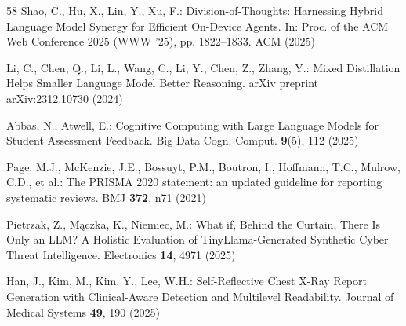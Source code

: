 \begin{thebibliography}{58}
Shao, C., Hu, X., Lin, Y., Xu, F.: Division-of-Thoughts: Harnessing Hybrid Language Model Synergy for Efficient On-Device Agents. In: Proc. of the ACM Web Conference 2025 (WWW '25), pp. 1822--1833. ACM (2025)

Li, C., Chen, Q., Li, L., Wang, C., Li, Y., Chen, Z., Zhang, Y.: Mixed Distillation Helps Smaller Language Model Better Reasoning. arXiv preprint arXiv:2312.10730 (2024)

Abbas, N., Atwell, E.: Cognitive Computing with Large Language Models for Student Assessment Feedback. Big Data Cogn. Comput. \textbf{9}(5), 112 (2025)

Page, M.J., McKenzie, J.E., Bossuyt, P.M., Boutron, I., Hoffmann, T.C., Mulrow, C.D., et al.: The PRISMA 2020 statement: an updated guideline for reporting systematic reviews. BMJ \textbf{372}, n71 (2021)

Pietrzak, Z., Mączka, K., Niemiec, M.: What if, Behind the Curtain, There Is Only an LLM? A Holistic Evaluation of TinyLlama-Generated Synthetic Cyber Threat Intelligence. Electronics \textbf{14}, 4971 (2025)

Han, J., Kim, M., Kim, Y., Lee, W.H.: Self-Reflective Chest X-Ray Report Generation with Clinical-Aware Detection and Multilevel Readability. Journal of Medical Systems \textbf{49}, 190 (2025)

\end{thebibliography}